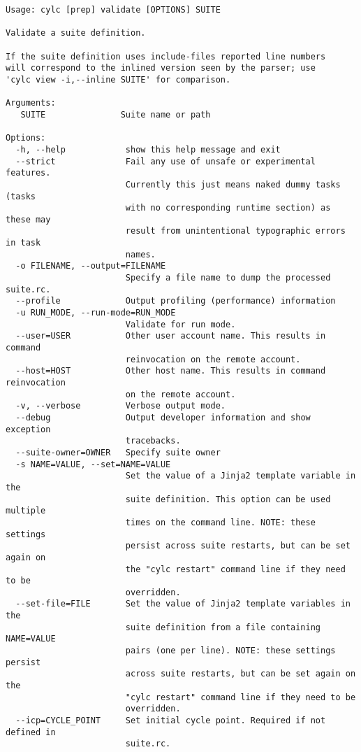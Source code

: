 \begin{lstlisting}
Usage: cylc [prep] validate [OPTIONS] SUITE 

Validate a suite definition.

If the suite definition uses include-files reported line numbers
will correspond to the inlined version seen by the parser; use
'cylc view -i,--inline SUITE' for comparison.

Arguments:
   SUITE               Suite name or path

Options:
  -h, --help            show this help message and exit
  --strict              Fail any use of unsafe or experimental features.
                        Currently this just means naked dummy tasks (tasks
                        with no corresponding runtime section) as these may
                        result from unintentional typographic errors in task
                        names.
  -o FILENAME, --output=FILENAME
                        Specify a file name to dump the processed suite.rc.
  --profile             Output profiling (performance) information
  -u RUN_MODE, --run-mode=RUN_MODE
                        Validate for run mode.
  --user=USER           Other user account name. This results in command
                        reinvocation on the remote account.
  --host=HOST           Other host name. This results in command reinvocation
                        on the remote account.
  -v, --verbose         Verbose output mode.
  --debug               Output developer information and show exception
                        tracebacks.
  --suite-owner=OWNER   Specify suite owner
  -s NAME=VALUE, --set=NAME=VALUE
                        Set the value of a Jinja2 template variable in the
                        suite definition. This option can be used multiple
                        times on the command line. NOTE: these settings
                        persist across suite restarts, but can be set again on
                        the "cylc restart" command line if they need to be
                        overridden.
  --set-file=FILE       Set the value of Jinja2 template variables in the
                        suite definition from a file containing NAME=VALUE
                        pairs (one per line). NOTE: these settings persist
                        across suite restarts, but can be set again on the
                        "cylc restart" command line if they need to be
                        overridden.
  --icp=CYCLE_POINT     Set initial cycle point. Required if not defined in
                        suite.rc.
\end{lstlisting}
